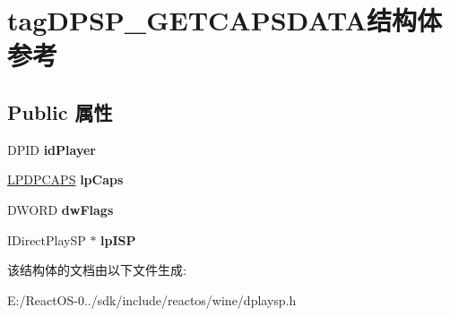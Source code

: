 \hypertarget{structtag_d_p_s_p___g_e_t_c_a_p_s_d_a_t_a}{}\section{tag\+D\+P\+S\+P\+\_\+\+G\+E\+T\+C\+A\+P\+S\+D\+A\+T\+A结构体 参考}
\label{structtag_d_p_s_p___g_e_t_c_a_p_s_d_a_t_a}
\subsection*{Public 属性}
\begin{DoxyCompactItemize}
\item 
\mbox{\label{structtag_d_p_s_p___g_e_t_c_a_p_s_d_a_t_a_aaf6497210053e26ef01c3471aa6920e2}} 
D\+P\+ID {\bfseries id\+Player}
\item 
\mbox{\label{structtag_d_p_s_p___g_e_t_c_a_p_s_d_a_t_a_ab86daac13c94a93a9b3b33f4dad862ca}} 
\hyperlink{structtag_d_p_c_a_p_s}{L\+P\+D\+P\+C\+A\+PS} {\bfseries lp\+Caps}
\item 
\mbox{\label{structtag_d_p_s_p___g_e_t_c_a_p_s_d_a_t_a_a3256ec9b1c85ce6bf7e7837a1c48d9a3}} 
D\+W\+O\+RD {\bfseries dw\+Flags}
\item 
\mbox{\label{structtag_d_p_s_p___g_e_t_c_a_p_s_d_a_t_a_a3d31025db9989af7dc133542ef88847f}} 
I\+Direct\+Play\+SP $\ast$ {\bfseries lp\+I\+SP}
\end{DoxyCompactItemize}


该结构体的文档由以下文件生成\+:\begin{DoxyCompactItemize}
\item 
E\+:/\+React\+O\+S-\/0../sdk/include/reactos/wine/dplaysp.\+h\end{DoxyCompactItemize}
